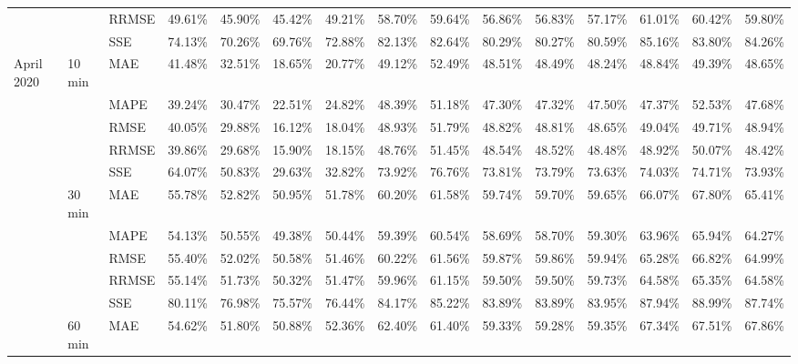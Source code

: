 {\begin{longtable}{lllcccccccccccc}
{} & {} & {RRMSE} & {49.61\%} & {45.90\%} & {45.42\%} & {49.21\%} & {58.70\%} & {59.64\%} & {56.86\%} & {56.83\%} & {57.17\%} & {61.01\%} & {60.42\%} & {59.80\%} \\
&  & {SSE} & {74.13\%} & {70.26\%} & {69.76\%} & {72.88\%} & {82.13\%} & {82.64\%} & {80.29\%} & {80.27\%} & {80.59\%} & {85.16\%} & {83.80\%} & {84.26\%} \\ \hline
{April 2020} & {10 min} & {MAE} & {41.48\%} & {32.51\%} & {18.65\%} & {20.77\%} & {49.12\%} & {52.49\%} & {48.51\%} & {48.49\%} & {48.24\%} & {48.84\%} & {49.39\%} & {48.65\%} \\
{} & {} & {MAPE} & {39.24\%} & {30.47\%} & {22.51\%} & {24.82\%} & {48.39\%} & {51.18\%} & {47.30\%} & {47.32\%} & {47.50\%} & {47.37\%} & {52.53\%} & {47.68\%} \\
{} & {} & {RMSE} & {40.05\%} & {29.88\%} & {16.12\%} & {18.04\%} & {48.93\%} & {51.79\%} & {48.82\%} & {48.81\%} & {48.65\%} & {49.04\%} & {49.71\%} & {48.94\%} \\
{} & {} & {RRMSE} & {39.86\%} & {29.68\%} & {15.90\%} & {18.15\%} & {48.76\%} & {51.45\%} & {48.54\%} & {48.52\%} & {48.48\%} & {48.92\%} & {50.07\%} & {48.42\%} \\
{} &  & {SSE} & {64.07\%} & {50.83\%} & {29.63\%} & {32.82\%} & {73.92\%} & {76.76\%} & {73.81\%} & {73.79\%} & {73.63\%} & {74.03\%} & {74.71\%} & {73.93\%} \\
{} & {30 min} & {MAE} & {55.78\%} & {52.82\%} & {50.95\%} & {51.78\%} & {60.20\%} & {61.58\%} & {59.74\%} & {59.70\%} & {59.65\%} & {66.07\%} & {67.80\%} & {65.41\%} \\
{} & {} & {MAPE} & {54.13\%} & {50.55\%} & {49.38\%} & {50.44\%} & {59.39\%} & {60.54\%} & {58.69\%} & {58.70\%} & {59.30\%} & {63.96\%} & {65.94\%} & {64.27\%} \\
{} & {} & {RMSE} & {55.40\%} & {52.02\%} & {50.58\%} & {51.46\%} & {60.22\%} & {61.56\%} & {59.87\%} & {59.86\%} & {59.94\%} & {65.28\%} & {66.82\%} & {64.99\%} \\
{} & {} & {RRMSE} & {55.14\%} & {51.73\%} & {50.32\%} & {51.47\%} & {59.96\%} & {61.15\%} & {59.50\%} & {59.50\%} & {59.73\%} & {64.58\%} & {65.35\%} & {64.58\%} \\
{} &  & {SSE} & {80.11\%} & {76.98\%} & {75.57\%} & {76.44\%} & {84.17\%} & {85.22\%} & {83.89\%} & {83.89\%} & {83.95\%} & {87.94\%} & {88.99\%} & {87.74\%} \\
{} & {60 min} & {MAE} & {54.62\%} & {51.80\%} & {50.88\%} & {52.36\%} & {62.40\%} & {61.40\%} & {59.33\%} & {59.28\%} & {59.35\%} & {67.34\%} & {67.51\%} & {67.86\%} \\

\end{longtable}}
